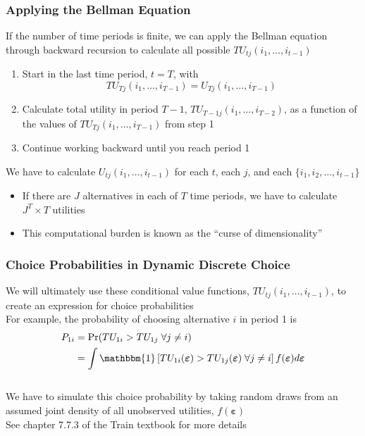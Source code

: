 \documentclass{beamer}
\begin{document}
\begin{frame}\frametitle{Applying the Bellman Equation}
    If the number of time periods is finite, we can apply the Bellman equation through backward recursion to calculate all possible $TU_{tj}(i_1, \ldots, i_{t-1})$
    \begin{enumerate}
        \item Start in the last time period, $t = T$, with
        $$TU_{Tj}(i_1, \ldots, i_{T-1}) = U_{Tj}(i_1, \ldots, i_{T-1})$$
        \item Calculate total utility in period $T - 1$, $TU_{T-1j}(i_1, \ldots, i_{T-2})$, as a function of the values of $TU_{Tj}(i_1, \ldots, i_{T-1})$ from step 1
        \item Continue working backward until you reach period 1
    \end{enumerate}
    \vspace{3ex}
    We have to calculate $U_{tj}(i_1, \ldots, i_{t-1})$ for each $t$, each $j$, and each $\{i_1, i_2, \ldots, i_{t-1}\}$
    \begin{itemize}
        \item If there are $J$ alternatives in each of $T$ time periods, we have to calculate $J^T \times T$ utilities
        \item This computational burden is known as the ``curse of dimensionality''
    \end{itemize}
\end{frame}

\begin{frame}\frametitle{Choice Probabilities in Dynamic Discrete Choice}
    We will ultimately use these conditional value functions, $TU_{tj}(i_1, \ldots, i_{t-1})$, to create an expression for choice probabilities \\
    \vspace{3ex}
    For example, the probability of choosing alternative $i$ in period 1 is
    \begin{align*}
        P_{1i} & = \Pr(TU_{1i} > TU_{1j} \; \forall j \neq i) \\
        & = \int \mathbbm{1} \left[ TU_{1i}(\bm{\varepsilon}) > TU_{1j}(\bm{\varepsilon}) \; \forall j \neq i \right] f(\bm{\varepsilon}) d \bm{\varepsilon}
    \end{align*} \\
    \vspace{3ex}
    We have to simulate this choice probability by taking random draws from an assumed joint density of all unobserved utilities, $f(\bm{\varepsilon})$ \\
    \vspace{3ex}
    See chapter 7.7.3 of the Train textbook for more details
\end{frame}
\end{document}
